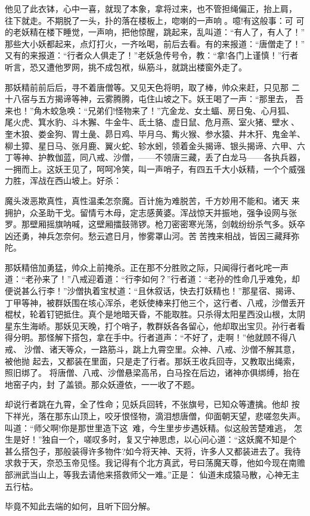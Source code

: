 他见了此衣钵，心中一喜，就现了本象，拿将过来，也不管担绳偏正，抬上肩，
往下就走。不期脱了一头，扑的落在楼板上，唿喇的一声响。噫!有这般事：可
可的老妖精在楼下睡觉，一声响，把他惊醒，跳起来，乱叫道：“有人了，有人了！”
那些大小妖都起来，点灯打火，一齐吆喝，前后去看。有的来报道：“唐僧走了！”
又有的来报道：“行者众人俱走了！”老妖急传号令，教：“拿!各门上谨慎！”行者
听言，恐又遭他罗网，挑不成包袱，纵筋斗，就跳出楼窗外走了。

那妖精前前后后，寻不着唐僧等。又见天色将明，取了棒，帅众来赶，只见那
二十八宿与五方揭谛等神，云雾腾腾，屯住山坡之下。妖王喝了一声：“那里去，
吾来也！”角木蛟急唤：“兄弟们!怪物来了！”亢金龙、女土蝠、房日兔、心月狐、
尾火虎、箕水豹、斗木獬、牛金牛、氐土貉、虚日鼠、危月燕、室火猪、壁水、
奎木狼、娄金狗、胃土彘、昴日鸡、毕月乌、觜火猴、参水猿、井木犴、鬼金羊、
柳土獐、星日马、张月鹿、翼火蛇、轸水蚓，领着金头揭谛、银头揭谛、六甲、六
丁等神、护教伽蓝，同八戒、沙僧，——不领唐三藏，丢了白龙马——各执兵器，
一拥而上。这妖王见了，呵呵冷笑，叫一声哨子，有四五千大小妖精，一个个威强
力胜，浑战在西山坡上。好杀：

魔头泼恶欺真性，真性温柔怎奈魔。百计施为难脱苦，千方妙用不能和。诸天
来拥护，众圣助干戈。留情亏木母，定志感黄婆。浑战惊天并振地，强争设网与张
罗。那壁厢摇旗呐喊，这壁厢擂鼓筛锣。枪刀密密寒光荡，剑戟纷纷杀气多。妖卒
凶还勇，神兵怎奈何。愁云遮日月，惨雾罩山河。苦苦拽来相战，皆因三藏拜弥
陀。

那妖精倍加勇猛，帅众上前掩杀。正在那不分胜败之际，只闻得行者叱咤一声
道：“老孙来了！”八戒迎着道：“行李如何？”行者道：“老孙的性命几乎难免，却
便说甚么行李！”沙僧执着宝杖道：“且休叙话，快去打妖精也！”那星宿、揭谛、
丁甲等神，被群妖围在垓心浑杀，老妖使棒来打他三个，这行者、八戒，沙僧丢开
棍杖，轮着钉钯抵住。真个是地暗天昏，不能取胜。只杀得太阳星西没山根，太阴
星东生海峤。那妖见天晚，打个哨子，教群妖各各留心，他却取出宝贝。孙行者看
得分明。那怪解下搭包，拿在手中。行者道声：“不好了，走啊！”他就顾不得八戒、
沙僧、诸天等众，一路筋斗，跳上九霄空里。众神、八戒、沙僧不解其意，被他抛
起去，又都装在里面，只是走了行者。那妖王收兵回寺，又教取出绳索，照旧绑了。
将唐僧、八戒、沙僧悬梁高吊，白马拴在后边，诸神亦俱绑缚，抬在地窑子内，封
了盖锁。那众妖遵依，一一收了不题。

却说行者跳在九霄，全了性命；见妖兵回转，不张旗号，已知众等遭擒。他却
按下祥光，落在那东山顶上，咬牙恨怪物，滴泪想唐僧，仰面朝天望，悲嗟忽失声。
叫道：“师父啊!你是那世里造下这难，今生里步步遇妖精。似这般苦楚难逃，
怎生是好！”独自一个，嗟叹多时，复又宁神思虑，以心问心道：“这妖魔不知是个
甚么搭包子，那般装得许多物件?如今将天神、天将，许多人又都装进去了。我待
求救于天，奈恐玉帝见怪。我记得有个北方真武，号曰荡魔天尊，他如今现在南赡
部洲武当山上，等我去请他来搭救师父一难。”正是：
仙道未成猿马散，心神无主五行枯。

毕竟不知此去端的如何，且听下回分解。